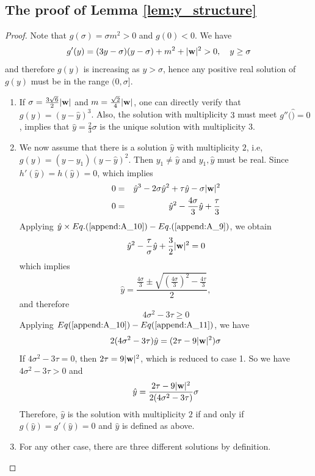 \documentclass[10pt,reqno]{amsart}
\renewcommand{\(}{\left(}
\renewcommand{\)}{\right)}
\newcommand{\bw}{{\bf w}}
\numberwithin{equation}{section}
\begin{document}
\subsection{The proof of Lemma \ref{lem:y_structure}} \label{app-lem:y_structure}
\begin{proof} Note that $g(\sigma)=\sigma m^2>0$ and $g(0)<0$.  We have 
\[
g'(y)=(3y -\sigma)(y-\sigma) + m^2+|\bw|^2> 0 ,  \quad y\ge \sigma
\]
and therefore $g(y)$ is increasing as $y>\sigma$, hence any positive real solution of $g(y)$ must be in the range $(0,\sigma ]$. 
\begin{enumerate}
	\item If $\sigma=\frac{3\sqrt6}{2}|\bw|$ and $m=\frac{\sqrt 2}{4}|\bw|$,  one can directly verify that $g(y)=(y-\hat y)^3$. Also,  the solution with multiplicity $3$ must meet $g''(\hat)=0$, implies that $\hat y = \frac 23 \sigma$ is the unique solution with multiplicity $3$. 
\item 
We now assume that there is a solution $\hat y$ with multiplicity $2$, i.e,  $g(y)= (y-y_1)(y-\hat y)^2$. Then $y_1\neq \hat y$ and $y_1,\hat y$ must be real.  Since $h'(\hat y)=h(\hat y)=0$,  which implies 
\begin{eqnarray}
0&=&\hat y^3 - 2\sigma \hat y^2  +\tau \hat y -\sigma |\bw|^2  \label{append:A_9}\\
0&=&\hat y^2 - \frac{4\sigma}{3} \hat y + \frac \tau 3  \label{append:A_10}
\end{eqnarray}
Applying $\hat y \times Eq. (\ref{append:A_10}) - Eq. (\ref{append:A_9})$, we obtain
\begin{equation}\label{append:A_11}
\hat y^2 -\frac{\tau}{\sigma} \hat  y + \frac{3}{2} |\bw|^2 = 0
\end{equation}
which implies
\[
\hat y = \frac{\frac{4\sigma}{3} \pm \sqrt{(\frac{4\sigma}{3})^2 - \frac{4\tau }3}}{2},
\]
and therefore
\[
4\sigma^2 -3 \tau \ge  0 
\]
Applying $Eq (\ref{append:A_10})-Eq(\ref{append:A_11})$, we have
\[
{2(4\sigma^2 -3\tau)} \hat y = (2\tau - 9|\bw|^2) \sigma
\]
If $4\sigma^2 -3 \tau =  0$, then $2\tau = 9|\bw|^2$,  which is reduced to case 1.  So we have
$4\sigma^2 -3 \tau > 0$ and
\[
 \hat y = \frac{2\tau - 9|\bw|^2}{2(4\sigma^2 -3\tau)} \sigma
\]
Therefore,  $\hat y$ is the solution with multiplicity $2$ if and only if $g(\hat y)=g'(\hat y)=0$ and $\hat y$ is defined as above.
\item For any other case,  there are three different solutions by definition.
\end{enumerate}
\end{proof}
\end{document}
